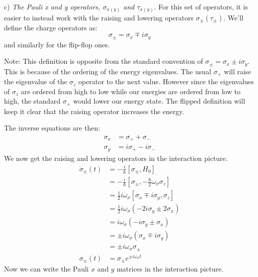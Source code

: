 \documentclass[
    preprint,
    amsmath,amssymb,
    aps,
    prb,
    floatfix,
]{revtex4-2}
\begin{document}
    c) \emph{The Pauli x and y operators, $\sigma_{x(y)}$ and $\tau_{x(y)}$}.
    For this set of operators, it is easier to instead work with the raising and lowering operators $\sigma_\pm (\tau_\pm)$. We'll define the charge operators as:
    \begin{equation}
        \sigma_\pm = \sigma_x \mp i\sigma_y
    \end{equation}
    and similarly for the flip-flop ones.
    \begin{framed}
        Note: This definition is opposite from the standard convention of $\sigma_\pm = \sigma_x \pm i\sigma_y$. This is because of the ordering of the energy eigenvalues. The usual $\sigma_+$ will raise the eigenvalue of the $\sigma_z$ operator to the next value. However since the eigenvalues of $\sigma_z$ are ordered from high to low while our energies are ordered from low to high, the standard $\sigma_+$ would lower our energy state. The flipped definition will keep it clear that the raising operator increases the energy.
    \end{framed}
    The inverse equations are then:
    \begin{align}
        \sigma_x &= \sigma_+ + \sigma_- \\
        \sigma_y &= i\sigma_+ - i\sigma_-
    \end{align}
    We now get the raising and lowering operators in the interaction picture.
    \begin{align*}
        \dot{\sigma}_\pm(t) &= -\frac{i}{\hbar}\left[\sigma_\pm,H_0\right] \\
                            &=-\frac{i}{\hbar}\left[\sigma_\pm,-\frac{\hbar}{2}\omega_\sigma\sigma_z \right] \\
                            &= \frac{1}{2}i\omega_\sigma \left[\sigma_x\mp i\sigma_y,\sigma_z \right] \\
                            &= \frac{1}{2}i\omega_\sigma\left( -2i\sigma_y \pm 2\sigma_x \right) \\
                            &= i\omega_\sigma\left( -i\sigma_y \pm \sigma_x \right) \\
                            &= \pm i\omega_\sigma(\sigma_x\mp i\sigma_y) \\
                            &= \pm i\omega_\sigma\sigma_\pm\\
                \sigma_\pm(t) &= \sigma_\pm e^{\pm i \omega_\sigma t}
    \end{align*}
    Now we can write the Pauli $x$ and $y$ matrices in the interaction picture.
\end{document}
